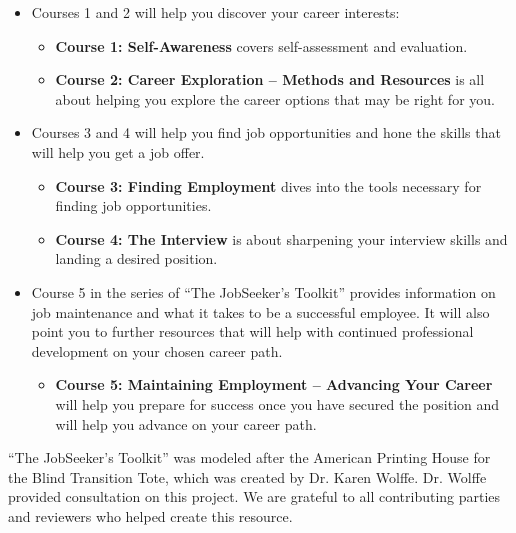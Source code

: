 \begin{itemize}[leftmargin=0.5cm]
\item[] Courses 1 and 2 will help you discover your career interests:
\begin{itemize}
\item[] \textbf{Course 1: Self-Awareness} covers self-assessment and evaluation.
\item[] \textbf{Course 2: Career Exploration – Methods and Resources} is all about helping you explore the career options that may be right for you.
\end{itemize}
\item[] Courses 3 and 4 will help you find job opportunities and hone the skills that will help you get a job offer.
\begin{itemize}
\item[] \textbf{Course 3: Finding Employment} dives into the tools necessary for finding job opportunities.

\item[] \textbf{Course 4: The Interview} is about sharpening your interview skills and landing a desired position.
\end{itemize}
\item[] Course 5 in the series of ``The JobSeeker's Toolkit'' provides information on job maintenance and what it takes to be a successful employee. It will also point you to further resources that will help with continued professional development on your chosen career path.
\begin{itemize}
\item[] \textbf{Course 5: Maintaining Employment – Advancing Your Career} will help you prepare for success once you have secured the position and will help you advance on your career path.
\end{itemize}
\end{itemize}
``The JobSeeker's Toolkit'' was modeled after the American Printing House for the Blind Transition Tote, which was created by Dr. Karen Wolffe. Dr. Wolffe provided consultation on this project. We are grateful to all contributing parties and reviewers who helped create this resource.

\clearpage
\mbox{}
